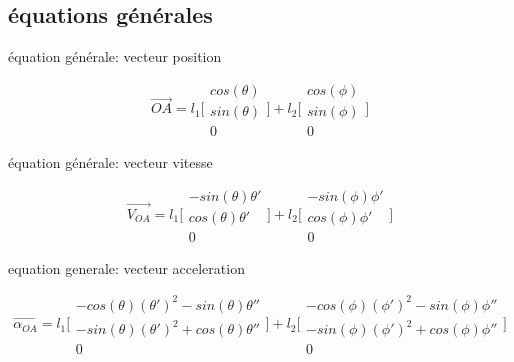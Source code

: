\documentclass{article}
\begin{document}
\subsection{équations générales}
équation générale: vecteur position

\begin{equation}
\overrightarrow{OA} = 
    l_1\Bigg[\begin{array}{cc}
    cos(\theta) \\
    sin(\theta) \\
    0
    \end{array}\Bigg]
    +
    l_2\Bigg[\begin{array}{cc}
    cos(\phi) \\
    sin(\phi) \\
    0
    \end{array}\Bigg]
\end{equation}

\noindent équation générale: vecteur vitesse

\begin{equation}
\overrightarrow{V_{OA}} = 
    l_1\Bigg[\begin{array}{cc}
    -sin(\theta)\theta' \\
    cos(\theta)\theta' \\
    0
    \end{array}\Bigg]
    +
    l_2\Bigg[\begin{array}{cc}
    -sin(\phi)\phi' \\
    cos(\phi)\phi' \\
    0
    \end{array}\Bigg]
\end{equation}

\noindent equation generale: vecteur acceleration

\begin{equation}
\overrightarrow{\alpha_{OA}} =
	l_1\Bigg[\begin{array}{cc}
	-cos(\theta)(\theta')^2-sin(\theta)\theta'' \\
	-sin(\theta)(\theta')^2+cos(\theta)\theta'' \\
	0
	\end{array}\Bigg]
	+
	l_2\Bigg[\begin{array}{cc}
	-cos(\phi)(\phi')^2-sin(\phi)\phi'' \\
	-sin(\phi)(\phi')^2+cos(\phi)\phi'' \\
	0
	\end{array}\Bigg]
\end{equation}
\end{document}
